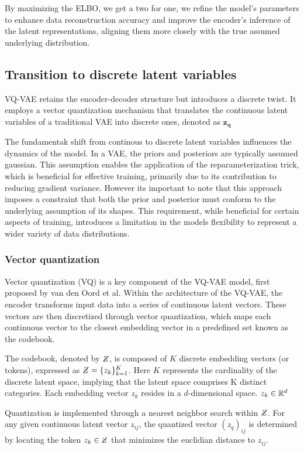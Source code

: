 By maximizing the ELBO, we get a two for one, we refine the model's parameters to enhance data reconstruction accuracy and improve the encoder's inference of the latent representations, aligning them more closely with the true assumed underlying distribution.\cite{VAE}
\subsection{Transition to discrete latent variables}
VQ-VAE retains the encoder-decoder structure but introduces a discrete twist. It employs a vector quantization mechanism that translates the continuous latent variables of a traditional VAE into discrete ones, denoted as $\mathbf{z_q}$

The fundamentak shift from continous to discrete latent variables influences the dynamics of the model. In a VAE, the priors and posteriors are typically assumed gaussian. This assumption enables the application of the reparameterization trick\cite{1312.6114}, which is beneficial for effective training, primarily due to its contribution to
reducing gradient variance. However its important to note that this approach imposes a constraint that both the prior and posterior must conform to the underlying assumption of its shapes. This requirement, while beneficial for certain aspects of training, introduces a limitation in the models flexibility to represent a wider variety of data distributions.


\subsubsection{Vector quantization}
Vector quantization (VQ) is a key component of the VQ-VAE model, first proposed by van den Oord et al\cite{neuvqvae}. Within the architecture of the VQ-VAE, the encoder transforms input data into a series of continuous latent vectors. These vectors are then discretized through vector quantization,
which maps each continuous vector to the closest embedding vector in a predefined set known as the codebook.

The codebook, denoted by $\Zstroke$, is composed of $K$ discrete embedding vectors (or tokens), expressed as $\Zstroke = \{z_k\}_{k=1}^K$. Here $K$ represents the cardinality of the discrete latent space,
implying that the latent space comprises K distinct categories. Each embedding vector $z_k$ resides in a $d$-dimensional space. $z_k \in \mathbb{R}^d$

Quantization is implemented through a nearest neighbor search within $\Zstroke$. For any given continuous latent vector $z_{ij}$, the quantized vector $(z_q)_{ij}$ is determined by locating the token $z_k \in \Zstroke$ that minimizes the euclidian distance to $z_{ij}$.

